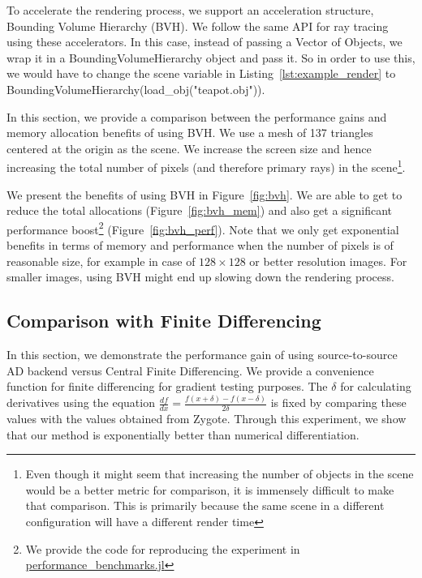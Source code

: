 \documentclass{juliacon}
\begin{document}
To accelerate the rendering process, we support an acceleration structure, Bounding Volume Hierarchy (BVH)\cite{Kay:1986:RTC:15922.15916}. We follow the same API for ray tracing using these accelerators. In this case, instead of passing a Vector of Objects, we wrap it in a BoundingVolumeHierarchy object and pass it. So in order to use this, we would have to change the scene variable in Listing~\ref{lst:example_render} to BoundingVolumeHierarchy(load\_obj("teapot.obj")).

In this section, we provide a comparison between the performance gains and memory allocation benefits of using BVH. We use a mesh of 137 triangles centered at the origin as the scene. We increase the screen size and hence increasing the total number of pixels (and therefore primary rays) in the scene\footnote{Even though it might seem that increasing the number of objects in the scene would be a better metric for comparison, it is immensely difficult to make that comparison. This is primarily because the same scene in a different configuration will have a different render time}.

We present the benefits of using BVH in Figure~\ref{fig:bvh}. We are able to get to reduce the total allocations (Figure~\ref{fig:bvh_mem}) and also get a significant performance boost\footnote{\raggedright{We provide the code for reproducing the experiment in \href{https://github.com/avik-pal/RayTracer.jl/examples/performance\_benchmarks.jl}{performance\_benchmarks.jl}}} (Figure~\ref{fig:bvh_perf}). Note that we only get exponential benefits in terms of memory and performance when the number of pixels is of reasonable size, for example in case of $128 \times 128$ or better resolution images. For smaller images, using BVH might end up slowing down the rendering process.

\subsection{Comparison with Finite Differencing}
\label{sec:finite_diff}

In this section, we demonstrate the performance gain of using source-to-source AD backend versus Central Finite Differencing. We provide a convenience function for finite differencing for gradient testing purposes. The $\delta$ for calculating derivatives using the equation $\frac{df}{dx} = \frac{f(x + \delta) - f(x - \delta)}{2\delta}$ is fixed by comparing these values with the values obtained from Zygote. Through this experiment, we show that our method is exponentially better than numerical differentiation.
\end{document}
